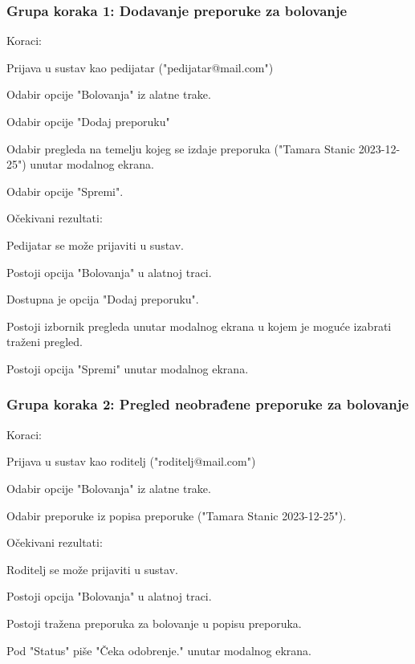 			 \subsubsection*{Grupa koraka 1: Dodavanje preporuke za bolovanje}
			 Koraci:
			 \begin{packed_enum}
				\item Prijava u sustav kao pedijatar ("pedijatar@mail.com")
				\item Odabir opcije "Bolovanja" iz alatne trake.
				\item Odabir opcije "Dodaj preporuku"
				\item Odabir pregleda na temelju kojeg se izdaje preporuka ("Tamara Stanic 2023-12-25") unutar modalnog ekrana.
				\item Odabir opcije "Spremi".
			 \end{packed_enum}
			 Očekivani rezultati:
			 \begin{packed_enum}
				\item Pedijatar se može prijaviti u sustav.
				\item Postoji opcija "Bolovanja" u alatnoj traci.
				\item Dostupna je opcija "Dodaj preporuku".
				\item Postoji izbornik pregleda unutar modalnog ekrana u kojem je moguće izabrati traženi pregled.
				\item Postoji opcija "Spremi" unutar modalnog ekrana.
			 \end{packed_enum}
	
			 \subsubsection*{Grupa koraka 2: Pregled neobrađene preporuke za bolovanje}
			 Koraci:
			 \begin{packed_enum}
				\item Prijava u sustav kao roditelj ("roditelj@mail.com")
				\item Odabir opcije "Bolovanja" iz alatne trake.
				\item Odabir preporuke iz popisa preporuke ("Tamara Stanic 2023-12-25").
			 \end{packed_enum}
			 Očekivani rezultati:
			 \begin{packed_enum}
				\item Roditelj se može prijaviti u sustav.
				\item Postoji opcija "Bolovanja" u alatnoj traci.
				\item Postoji tražena preporuka za bolovanje u popisu preporuka.
				\item Pod "Status" piše "Čeka odobrenje." unutar modalnog ekrana.
			 \end{packed_enum}

